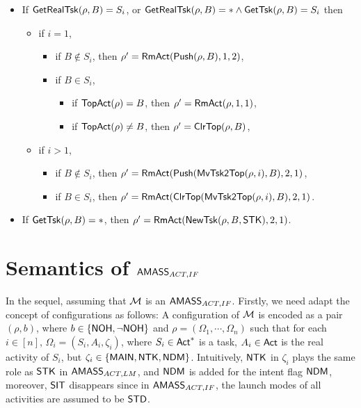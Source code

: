 \noindent  {}
\begin{itemize}
	\item If $\mathsf{GetRealTsk}(\rho, B) = S_i$, or $\mathsf{GetRealTsk}(\rho,B) = *\wedge\mathsf{GetTsk}(\rho,B) = S_i$ then
	\begin{itemize}
		\item if $i = 1$,
		\begin{itemize}
			\item if $B \not \in S_i$, then $\rho' = \mathsf{RmAct}(\mathsf{Push}(\rho, B), 1, 2)$,
			\item if $B \in S_i$, 
			\begin{itemize}
				\item if $\mathsf{TopAct}(\rho) = B$, then $\rho' = \mathsf{RmAct}(\rho, 1, 1)$,
				\item if $\mathsf{TopAct}(\rho) \neq B$, then $\rho' = \mathsf{ClrTop}(\rho, B)$,
			\end{itemize}
		\end{itemize}
		\item if $i > 1$,
		\begin{itemize}
			\item if $B \not \in S_i$, then $\rho' = \mathsf{RmAct}(\mathsf{Push}(\mathsf{MvTsk2Top}(\rho, i), B), 2, 1)$,
			\item if $B \in S_i$, 	then $\rho' =  \mathsf{RmAct}(\mathsf{ClrTop}(\mathsf{MvTsk2Top}(\rho, i), B), 2, 1)$.
		\end{itemize}
	\end{itemize}
\item If $\mathsf{GetTsk}(\rho, B) = *$, then $\rho' = \mathsf{RmAct}(\mathsf{NewTsk}(\rho, B,{\sf STK}), 2, 1)$.
\end{itemize}

\section{Semantics of {$\textsf{AMASS}_{ACT,IF}$}}\label{app-ifaoamass}

In the sequel, assuming that ${\mathcal{M} }$ is an $\textsf{AMASS}_{ACT,IF}$.
Firstly, we need adapt the concept of configurations as follows:
A configuration of ${\mathcal{M} }$ is 
encoded as a pair $(\rho, b)$, where $b \in \{{\sf NOH}, \neg {\sf NOH}\}$ and 
$\rho=(\Omega_1,\cdots,\Omega_n)$ such that for each $i \in [n]$, $\Omega_i = (S_i, A_i, \zeta_i)$, where $S_i \in {\sf Act}^*$ is a task, $A_i \in {\sf Act}$ is the real activity of $S_i$, but $\zeta_i \in \{{\sf MAIN}, {\sf NTK}, {\sf NDM}\}$. Intuitively, 
${\sf NTK}$ in $\zeta_i$ plays the same role as ${\sf STK}$ in $\textsf{AMASS}_{ACT,LM}$, and ${\sf NDM}$ is added for the intent flag ${\sf NDM}$, moreover, ${\sf SIT}$ disappears since in $\textsf{AMASS}_{ACT,IF}$, the launch modes of all activities are assumed to be ${\sf STD}$.

